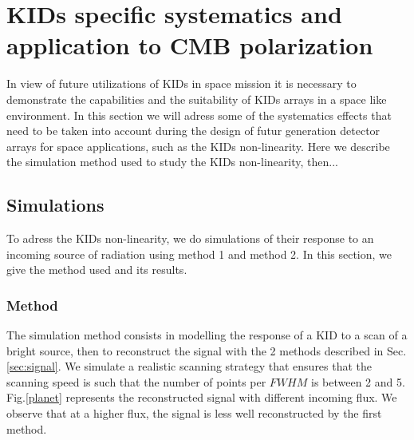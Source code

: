 
\section{KIDs specific systematics and application to CMB polarization}

In view of future utilizations of KIDs in space mission it is necessary to demonstrate the capabilities and the suitability of KIDs arrays in a space like environment. In this section we will adress some of the systematics effects that need to be taken into account during the design of futur generation detector arrays for space applications, such as the KIDs non-linearity. Here we describe the simulation method used to study the KIDs non-linearity, then...\\

\subsection{Simulations}
To adress the KIDs non-linearity, we do simulations of their response to an incoming source of radiation using method 1 and method 2. In this section, we give the method used and its results.

	\subsubsection{Method}
	
The simulation method consists in modelling the response of a KID to a scan of a bright source, then to reconstruct the signal with the 2 methods described  in Sec.\ref{sec:signal}. We simulate a realistic scanning strategy that ensures that the scanning speed is such that the number of points per $FWHM$ is between 2 and 5.
Fig.\ref{planet} represents the reconstructed signal with different incoming flux. We observe that at a higher flux, the signal is less well reconstructed by the first method.

